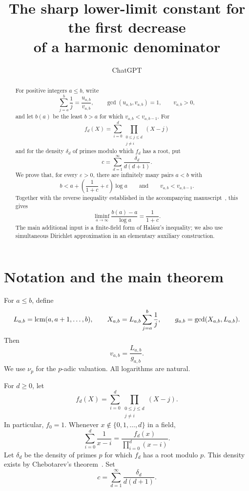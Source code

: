 \documentclass[11pt]{article}
\title{The sharp lower-limit constant for the first decrease\\
of a harmonic denominator}
\author{ChatGPT}
\date{}
\newcommand{\lcm}{\mathop{\rm lcm}}
\begin{document}
\maketitle

\begin{abstract}
For positive integers $a\leq b$, write
\[
  \sum_{j=a}^{b}\frac1j=\frac{u_{a,b}}{v_{a,b}},
  \qquad \gcd(u_{a,b},v_{a,b})=1,
  \qquad v_{a,b}>0,
\]
and let $b(a)$ be the least $b>a$ for which $v_{a,b}<v_{a,b-1}$.
For
\[
  f_d(X)=\sum_{i=0}^{d}\prod_{\substack{0\leq j\leq d\\j\neq i}}(X-j)
\]
and for the density $\delta_d$ of primes modulo which $f_d$ has a root, put
\[
  c=\sum_{d=1}^{\infty}\frac{\delta_d}{d(d+1)}.
\]
We prove that, for every $\varepsilon>0$, there are infinitely many pairs $a<b$ with
\[
  b<a+\left(\frac1{1+c}+\varepsilon\right)\log a
  \qquad\text{and}\qquad
  v_{a,b}<v_{a,b-1}.
\]
Together with the reverse inequality established in the accompanying manuscript~\cite{VD}, this gives
\[
  \liminf_{a\to\infty}\frac{b(a)-a}{\log a}=\frac1{1+c}.
\]
The main additional input is a finite-field form of Hal\'asz's inequality; we also use simultaneous Dirichlet approximation in an elementary auxiliary construction.
\end{abstract}

\section{Notation and the main theorem}

For $a\leq b$, define
\[
  L_{a,b}=\lcm(a,a+1,\ldots,b),
  \qquad
  X_{a,b}=L_{a,b}\sum_{j=a}^{b}\frac1j,
  \qquad
  g_{a,b}=\gcd(X_{a,b},L_{a,b}).
\]
Then
\[
  v_{a,b}=\frac{L_{a,b}}{g_{a,b}}.
\]
We use $\nu_p$ for the $p$-adic valuation. All logarithms are natural.

For $d\geq0$, let
\[
  f_d(X)=\sum_{i=0}^{d}\prod_{\substack{0\leq j\leq d\\j\neq i}}(X-j).
\]
In particular, $f_0=1$. Whenever $x\notin\{0,1,\ldots,d\}$ in a field,
\begin{equation}\label{eq:partial-fraction}
  \sum_{i=0}^{d}\frac1{x-i}
  =\frac{f_d(x)}{\prod_{i=0}^{d}(x-i)}.
\end{equation}
Let $\delta_d$ be the density of primes $p$ for which $f_d$ has a root modulo $p$. This density exists by Chebotarev's theorem~\cite{Chebotarev}. Set
\begin{equation}\label{eq:def-c}
  c=\sum_{d=1}^{\infty}\frac{\delta_d}{d(d+1)}.
\end{equation}
\end{document}
